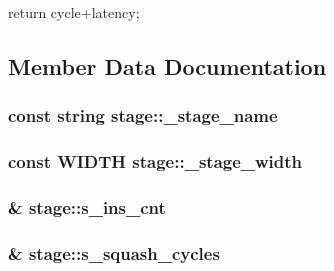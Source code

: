 \begin{DoxyCode}
                       {
        return cycle+latency;
}
\end{DoxyCode}


\subsection{Member Data Documentation}
\hypertarget{classstage_ad8500743b9a08a7d3b7a16e2c9ee7bca}{
\subsubsection[{\_\-stage\_\-name}]{\setlength{\rightskip}{0pt plus 5cm}const string {\bf stage::\_\-stage\_\-name}}}
\label{classstage_ad8500743b9a08a7d3b7a16e2c9ee7bca}
\hypertarget{classstage_a758da5ef14d0eca96290d4feaad91302}{
\subsubsection[{\_\-stage\_\-width}]{\setlength{\rightskip}{0pt plus 5cm}const {\bf WIDTH} {\bf stage::\_\-stage\_\-width}}}
\label{classstage_a758da5ef14d0eca96290d4feaad91302}
\hypertarget{classstage_a41c52c3b31e0cd1729c3665bbacb4f5d}{
\subsubsection[{s\_\-ins\_\-cnt}]{\& {\bf stage::s\_\-ins\_\-cnt}}}
\label{classstage_a41c52c3b31e0cd1729c3665bbacb4f5d}
\hypertarget{classstage_a8936cf4c32fa9d9f27ca8d3306468cc8}{
\subsubsection[{s\_\-squash\_\-cycles}]{\& {\bf stage::s\_\-squash\_\-cycles}}}
